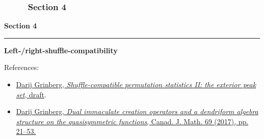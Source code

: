\documentclass{beamer}
\newcommand{\red}{\color{red}}
\newcommand{\fti}[1]{\frametitle{\ \ \ \ \ #1}}
\theoremstyle{plain}
\begin{document}
\begin{frame}
\fti{Section 4}
\begin{center}
{\LARGE \bf Section 4} \\
\noindent\rule[0.5ex]{\linewidth}{1pt}
{\Large \bf Left-/right-shuffle-compatibility}
\end{center}
\vspace{1cm}
References:
\begin{itemize}
\item \href{https://github.com/darijgr/gzshuf}{\red Darij Grinberg, \textit{Shuffle-compatible permutation statistics II: the exterior peak set}, draft}.
\item \href{http://www.cip.ifi.lmu.de/~grinberg/algebra/dimcreation.pdf}{\red Darij Grinberg, \textit{Dual immaculate creation operators and a dendriform algebra structure on the quasisymmetric functions}, Canad. J. Math. 69 (2017), pp. 21--53.}
\end{itemize}
\end{frame}
\end{document}
